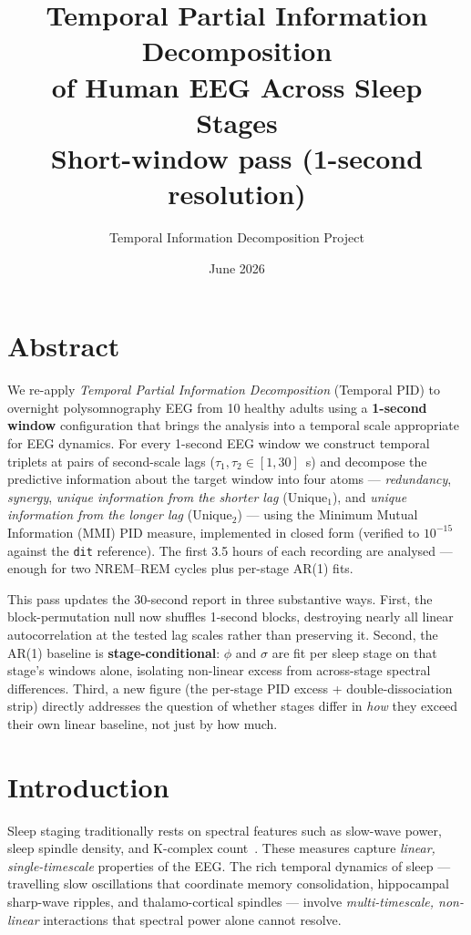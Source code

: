 \documentclass[11pt,a4paper]{article}
\title{\textbf{Temporal Partial Information Decomposition\\of Human EEG Across Sleep Stages}\\[4pt]
\large Short-window pass (1-second resolution)}
\author{Temporal Information Decomposition Project}
\date{June 2026}
\begin{document}
\maketitle
\tableofcontents
\newpage

\section{Abstract}

We re-apply \emph{Temporal Partial Information Decomposition} (Temporal PID) to
overnight polysomnography EEG from 10 healthy adults using a \textbf{1-second
window} configuration that brings the analysis into a temporal scale appropriate
for EEG dynamics.  For every 1-second EEG window we construct temporal triplets
at pairs of second-scale lags ($\tau_1, \tau_2 \in [1, 30]$~s) and decompose the
predictive information about the target window into four atoms ---
\emph{redundancy}, \emph{synergy}, \emph{unique information from the shorter
lag} (Unique$_1$), and \emph{unique information from the longer lag}
(Unique$_2$) --- using the Minimum Mutual Information (MMI) PID measure,
implemented in closed form (verified to $10^{-15}$ against the \texttt{dit}
reference).  The first 3.5 hours of each recording are analysed --- enough for
two NREM--REM cycles plus per-stage AR(1) fits.

This pass updates the 30-second report in three substantive ways.  First, the
block-permutation null now shuffles 1-second blocks, destroying nearly all
linear autocorrelation at the tested lag scales rather than preserving it.
Second, the AR(1) baseline is \textbf{stage-conditional}: $\phi$ and $\sigma$
are fit per sleep stage on that stage's windows alone, isolating non-linear
excess from across-stage spectral differences.  Third, a new figure (the
per-stage PID excess + double-dissociation strip) directly addresses the
question of whether stages differ in \emph{how} they exceed their own linear
baseline, not just by how much.

\section{Introduction}

Sleep staging traditionally rests on spectral features such as slow-wave power,
sleep spindle density, and K-complex count~\citep{berry2012aasm}.
These measures capture \emph{linear, single-timescale} properties of the EEG.
The rich temporal dynamics of sleep --- travelling slow oscillations that
coordinate memory consolidation, hippocampal sharp-wave ripples, and
thalamo-cortical spindles --- involve \emph{multi-timescale, non-linear}
interactions that spectral power alone cannot resolve.
\end{document}

